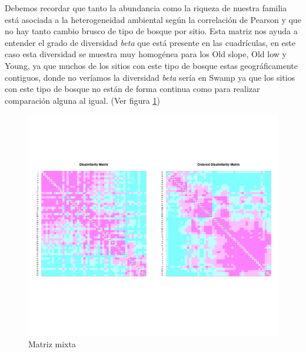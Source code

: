 \documentclass[11pt,]{article}
\begin{document}
Debemos recordar que tanto la abundancia como la riqueza de nuestra
familia está asociada a la heterogeneidad ambiental según la correlación
de Pearson y que no hay tanto cambio brusco de tipo de bosque por sitio.
Esta matriz nos ayuda a entender el grado de diversidad \emph{beta} que
está presente en las cuadrículas, en este caso esta diversidad se
muestra muy homogénea para los Old slope, Old low y Young, ya que muchos
de los sitios con este tipo de bosque estas geográficamente contiguos,
donde no veríamos la diversidad \emph{beta} sería en Swamp ya que los
sitios con este tipo de bosque no están de forma continua como para
realizar comparación alguna al igual. (Ver figura \ref{fig:punt_z})

\begin{figure}
\centering
\includegraphics{punt_z.png}
\caption{\label{fig:punt_z}Matriz mixta}
\end{figure}
\end{document}
